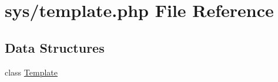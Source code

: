 \hypertarget{template_8php}{}\section{sys/template.php File Reference}
\label{template_8php}
\subsection*{Data Structures}
\begin{DoxyCompactItemize}
\item 
class \hyperlink{classTemplate}{Template}
\end{DoxyCompactItemize}
